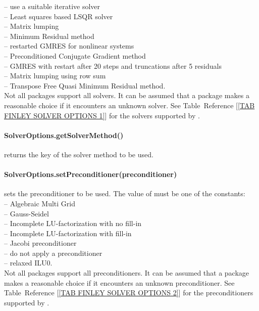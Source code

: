   -- use a suitable iterative solver\\
  -- Least squares based LSQR solver\\
  -- Matrix lumping\\
  -- Minimum Residual method\\
  -- restarted GMRES for nonlinear systems\\
  -- Preconditioned Conjugate Gradient method\\
  -- GMRES with restart after 20 steps and truncations after 5 residuals\\
 -- Matrix lumping using row sum\\
  -- Transpose Free Quasi Minimum Residual method.\\
Not all packages support all solvers. It can be assumed that a package makes a
reasonable choice if it encounters an unknown solver.
See Table~Reference [\ref{TAB FINLEY SOLVER OPTIONS 1}] for the solvers supported by
\finley.


\paragraph{SolverOptions.getSolverMethod()}
returns the key of the solver method to be used.


\paragraph{SolverOptions.setPreconditioner(preconditioner)}
sets the preconditioner to be used.
The value of  must be one of the constants:\\
  -- Algebraic Multi Grid\\
  -- Gauss-Seidel\\
  -- Incomplete LU-factorization with no fill-in\\
  -- Incomplete LU-factorization with fill-in\\
  -- Jacobi preconditioner\\
  -- do not apply a preconditioner\\
  -- relaxed ILU0.\\
Not all packages support all preconditioners. It can be assumed that a package
makes a reasonable choice if it encounters an unknown preconditioner.
See Table~Reference [\ref{TAB FINLEY SOLVER OPTIONS 2}] for the preconditioners supported
by \finley.

